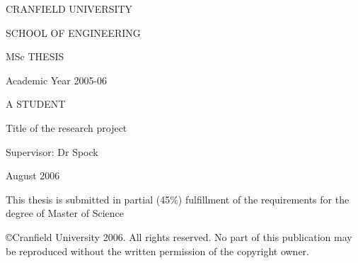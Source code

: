 


\thispagestyle{empty}

\large \begin{center}

\vspace{30mm}

CRANFIELD UNIVERSITY

\vspace{20mm}

SCHOOL OF ENGINEERING

\vspace{15mm}

MSc THESIS

\vspace{15mm}

Academic Year 2005-06

\vspace{15mm} \Large

A STUDENT

\vspace{15mm}

Title of the research project

\vspace{20mm} \large

Supervisor: \hspace{30mm} Dr Spock

\vspace{10mm}

August 2006

\vspace{10mm} \normalsize


This thesis is submitted in partial (45\%) fulfillment of the
requirements for the degree of Master of Science

\vspace{10mm}

\copyright Cranfield University 2006.  All rights reserved.  No
part of this publication may be reproduced without the written
permission of the copyright owner.

\end{center}

\pagebreak


\ClearDoublePageOrNot{\controlClearPage} %



